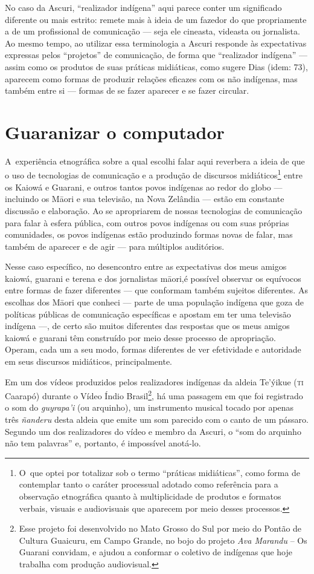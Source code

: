 No caso da Ascuri, ``realizador indígena'' aqui parece conter um
significado diferente ou mais estrito: remete mais à ideia de um
fazedor do que propriamente a de um profissional de comunicação --- seja
ele cineasta, videasta ou jornalista. Ao mesmo tempo, ao utilizar essa
terminologia a Ascuri responde às expectativas expressas pelos
``projetos'' de comunicação, de forma que ``realizador indígena'' --- assim
como os produtos de suas práticas midiáticas, como sugere Dias (idem:
73), aparecem como formas de produzir relações eficazes com os não
indígenas, mas também entre si --- formas de se fazer aparecer e se fazer
circular.


\section{Guaranizar o computador}

A~experiência etnográfica sobre a qual escolhi falar aqui reverbera a
ideia de que o uso de tecnologias de comunicação e a produção de
discursos midiáticos\footnote[13]{O~que optei por totalizar sob o termo
``práticas midiáticas'', como forma de contemplar tanto o caráter
processual adotado como referência para a observação etnográfica quanto
à multiplicidade de produtos e formatos verbais, visuais e audiovisuais
que aparecem por meio desses processos.} entre os Kaiowá e Guarani, e
outros tantos povos indígenas ao redor do globo --- incluindo os M\=aori
e sua televisão, na Nova Zelândia --- estão em constante discussão e
elaboração. Ao se apropriarem de nossas tecnologias de comunicação para
falar à esfera pública, com outros povos indígenas ou com suas próprias
comunidades, os povos indígenas estão produzindo formas novas de falar,
mas também de aparecer e de agir --- para múltiplos auditórios.

Nesse caso específico, no desencontro entre as expectativas dos meus
amigos kaiowá, guarani e terena e dos jornalistas m\=aori,é possível observar os
equívocos entre formas de fazer diferentes --- que conformam também
sujeitos diferentes. As escolhas dos M\=aori que conheci --- parte de uma
população indígena que goza de políticas públicas de comunicação
específicas e apostam em ter uma televisão indígena ---, de certo são
muitos diferentes das respostas que os meus amigos kaiowá e guarani têm
construído por meio desse processo de apropriação. Operam, cada um a
seu modo, formas diferentes de ver efetividade e autoridade em seus
discursos midiáticos, principalmente.

Em um dos vídeos produzidos pelos realizadores indígenas da aldeia
Te’ýikue (\textsc{ti} Caarapó) durante o Vídeo Índio Brasil\footnote[14]{Esse
projeto foi desenvolvido no Mato Grosso do Sul por meio do Pontão de
Cultura Guaicuru, em Campo Grande, no bojo do projeto \emph{Ava Marandu} -- Os
Guarani convidam, e ajudou a conformar o coletivo de indígenas que hoje
trabalha com produção audiovisual. }, há uma passagem em que foi
registrado o som do \emph{guyrapa’i} (ou arquinho), um instrumento musical
tocado por apenas três \emph{ñanderu} desta aldeia que emite um som parecido
com o canto de um pássaro. Segundo um dos realizadores do vídeo e
membro da Ascuri, o ``som do arquinho não tem palavras'' e, portanto, é
impossível anotá-lo.

